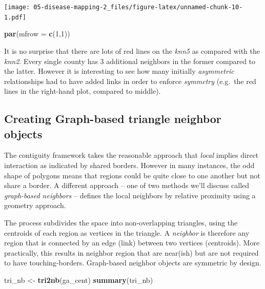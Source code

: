 \documentclass[
]{book}
\newenvironment{Shaded}{\begin{snugshade}}{\end{snugshade}}
\newcommand{\AttributeTok}[1]{\textcolor[rgb]{0.13,0.29,0.53}{#1}}
\newcommand{\DecValTok}[1]{\textcolor[rgb]{0.00,0.00,0.81}{#1}}
\newcommand{\FunctionTok}[1]{\textcolor[rgb]{0.13,0.29,0.53}{\textbf{#1}}}
\newcommand{\NormalTok}[1]{#1}
\newcommand{\OtherTok}[1]{\textcolor[rgb]{0.56,0.35,0.01}{#1}}
\begin{document}
\texttt{[image: 05-disease-mapping-2\_files/figure-latex/unnamed-chunk-10-1.pdf]}

\begin{Shaded}
\begin{Highlighting}[]
\FunctionTok{par}\NormalTok{(}\AttributeTok{mfrow =} \FunctionTok{c}\NormalTok{(}\DecValTok{1}\NormalTok{,}\DecValTok{1}\NormalTok{))}
\end{Highlighting}
\end{Shaded}

It is no surprise that there are lots of red lines on the \emph{knn5} as compared with the \emph{knn2}. Every single county has 3 additional neighbors in the former compared to the latter. However it is interesting to see how many initially \emph{asymmetric} relationships had to have added links in order to enforce \emph{symmetry} (e.g.~the red lines in the right-hand plot, compared to middle).

\hypertarget{creating-graph-based-triangle-neighbor-objects}{%
\subsection{Creating Graph-based triangle neighbor objects}\label{creating-graph-based-triangle-neighbor-objects}}

The contiguity framework takes the reasonable approach that \emph{local} implies direct interaction as indicated by shared borders. However in many instances, the odd shape of polygons means that regions could be quite close to one another but not share a border. A different approach -- one of two methods we'll discuss called \emph{graph-based neighbors} -- defines the local neighbors by relative proximity using a geometry approach.

The process subdivides the space into non-overlapping triangles, using the centroids of each region as vertices in the triangle. A \emph{neighbor} is therefore any region that is connected by an edge (link) between two vertices (centroids). More practically, this results in neighbor region that are near(ish) but are not required to have touching-borders. Graph-based neighbor objects are symmetric by design.

\begin{Shaded}
\begin{Highlighting}[]
\NormalTok{tri\_nb }\OtherTok{\textless{}{-}} \FunctionTok{tri2nb}\NormalTok{(ga\_cent)}
\FunctionTok{summary}\NormalTok{(tri\_nb)}
\end{Highlighting}
\end{Shaded}
\end{document}

